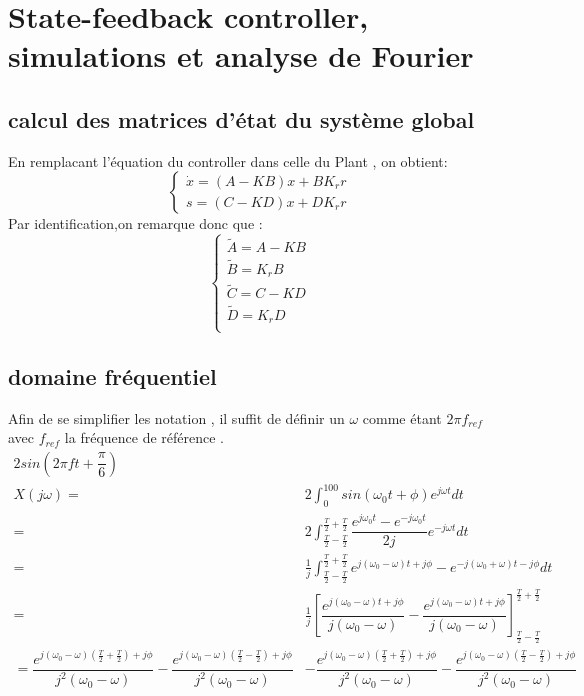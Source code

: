 \documentclass[11pt,a4paper]{article}
\begin{document}
\section{State-feedback controller, simulations et analyse de Fourier}
\subsection{}
\subsection{calcul des matrices d'état du système global}
En remplacant l'équation du controller dans celle du Plant , on obtient:
\begin{equation}
\begin{cases}
\dot x= (A-KB)x+BK_rr \\
s= (C-KD)x+DK_rr
\end{cases}
\end{equation}
Par identification,on remarque donc que : \\
\begin{equation}
\begin{cases}
\tilde{A} = A-KB \\
\tilde{B} = K_rB \\
\tilde{C} = C-KD \\
\tilde{D} = K_rD \\
\end{cases}
\end{equation}
\subsection{domaine fréquentiel}

Afin de se simplifier les notation , il suffit de définir un $\omega$ comme étant $2\pi f_{ref}$ avec $f_{ref}$ la fréquence de référence .  \\
 
\begin{align*}
 2sin(2\pi f t + \dfrac{\pi}{6}) & \\
X(j\omega)=& 2 \int_{0}^{100} sin(\omega _{0}t + \phi)e^{j\omega t} dt \\
  =& 2 \int_{\frac T2 - \frac T2} ^{\frac T2 + \frac T2} \dfrac{e^{j \omega _0 t}-e^{-j \omega _0 t}}{2j} e^{-j\omega t} dt  \\
  =& \frac 1j \int_{\frac T2 - \frac T2} ^{\frac T2 + \frac T2} e^{j (\omega _0 - \omega)t+j\phi }- e^{-j( \omega _0+ \omega)t-j\phi} dt \\
  =& \frac 1j \left [ \dfrac{e^{j(\omega_0-\omega)t+j\phi}}{j(\omega_0-\omega)}- \dfrac{e^{j(\omega_0-\omega)t+j\phi}}{j(\omega_0-\omega)} \right] _{\frac T2 - \frac T2} ^{\frac T2 + \frac T2} \\
  =\dfrac{e^{j(\omega_0-\omega)\left(\frac T2+ \frac T 2 \right)+ j \phi}}{j^2 (\omega_ 0 -\omega)}-\dfrac{e^{j(\omega_0-\omega)\left(\frac T2- \frac T 2 \right)+ j \phi}}{j^2 (\omega_ 0 -\omega)} &- \dfrac{e^{j(\omega_0-\omega)\left(\frac T2+ \frac T 2 \right)+ j \phi}}{j^2 (\omega_ 0 -\omega)}-\dfrac{e^{j(\omega_0-\omega)\left(\frac T2- \frac T 2 \right)+ j \phi}}{j^2 (\omega_ 0 -\omega)} 
\end{align*}
\end{document}
